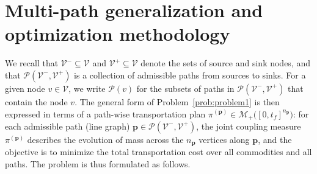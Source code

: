 \documentclass[11pt]{article}
\newcommand{\calV}{{\mathcal V}}
\newcommand{\calP}{{\mathcal P}}
\newcommand{\bp}{{\mathbf p}}
\begin{document}
\section{Multi-path generalization and optimization methodology}\label{sec:general}

We recall that $\calV^-\subseteq\calV$ and $\calV^+\subseteq\calV$ denote the sets of source and sink nodes, and that $\calP(\calV^-,\calV^+)$ is a collection of admissible paths from sources to sinks. 
For a given node $v\in\calV$, we write $\calP(v)$ for the subsets of paths in $\calP(\calV^-,\calV^+)$ that contain the node $v$.
The general form of Problem~\ref{prob:problem1} is then expressed in terms of a path-wise transportation plan $\pi^{(\bp)} \in \mathcal{M}_{+}\big([0,t_f]^{n_\bp}\big)$: for each admissible path (line graph) $\bp \in \calP(\calV^-,\calV^+)$, the joint coupling measure $\pi^{(\bp)}$ describes the evolution of mass across the $n_\bp$ vertices along $\bp$, and the objective is to minimize the total transportation cost over all commodities and all paths. 
The problem is thus formulated as follows.
\end{document}
